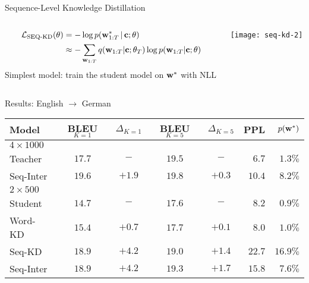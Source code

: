 \begin{frame}{Sequence-Level Knowledge Distillation}

\air  
\begin{columns}
\begin{column}{5.5cm}
\begin{align*}
\mathcal{L}_\text{SEQ-KD}(\theta) &= -\log p(\mathbf{w}^*_{1:T} \,|\, \mathbf{c} ; \theta)  \\
& \displaystyle \approx   -\sum_{\mathbf{w}_{1:T}} q(\mathbf{w}_{1:T} | \mathbf{c}; \theta_T) \log p(\mathbf{w}_{1:T} | \mathbf{c} ; \theta)
\end{align*}
Simplest model: train the student model on $\mathbf{w}^*$ with NLL
\end{column}
\begin{column}{5.5cm}
\texttt{[image: seq-kd-2]}
\end{column}
\end{columns}
\end{frame}

\begin{frame}{Results: English $\rightarrow$ German}
\air
\air
\begin{table}
\centering
\small
\begin{tabular}{lccccrr}
\toprule
Model &    BLEU$_{K=1}$   & $\Delta_{K=1}$ & BLEU$_{K=5}$ & $\Delta_{K=5}$ & PPL & $p(\mathbf{w}^*)$ \\
\midrule
$4 \times 1000$ \\
Teacher    & $17.7$ &  $-$ & $19.5$&   $-$ &   $6.7$ &  $1.3\%$ \\
\hspace{1mm} Seq-Inter    & $19.6$ & $+1.9$&  $19.8$& $+0.3$&   $10.4$ & $8.2\%$   \\
\midrule
$2 \times 500$ \\ 
Student  $\,$   & $14.7$ & $-$ & $17.6$&  $-$ &  $8.2$ & $0.9\%$  \\
\hspace{1mm} Word-KD  & $15.4$ & $+0.7$& $17.7$& $+0.1$&  $8.0$ & $1.0\%$  \\
\hspace{1mm} Seq-KD   & $18.9$ & $+\mathbf{4.2}$& $19.0$& $+1.4$&  $22.7$ & $16.9\%$ \\
\hspace{1mm} Seq-Inter  & $18.9$ & $+\mathbf{4.2}$&$19.3$ & $+\mathbf{1.7}$ &  $15.8$ & $7.6\%$  \\
\bottomrule
\end{tabular}

\end{table}
\air
\air
\end{frame}

